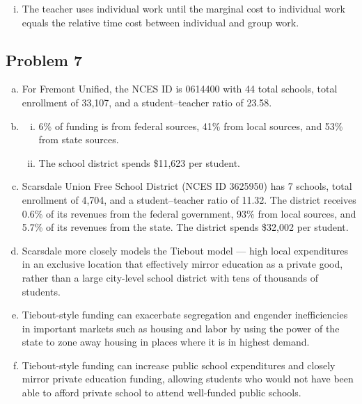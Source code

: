 \documentclass[8pt]{extarticle}
\begin{document}
\begin{enumerate}[(a)]
\begin{enumerate}[(i)]
\begin{center}
          \end{center}
        \item The teacher uses individual work until the marginal cost to individual work equals the relative time cost between individual and group work.
      \end{enumerate}
  \end{enumerate}
\subsection{Problem 7}%
\begin{enumerate}[(a)]
  \item For Fremont Unified, the NCES ID is 0614400 with 44 total schools, total enrollment of 33,107, and a student--teacher ratio of 23.58.
  \item 
    \begin{enumerate}[(i)]
      \item 6\% of funding is from federal sources, 41\% from local sources, and 53\% from state sources.
      \item The school district spends \$11,623 per student.
    \end{enumerate}
  \item Scarsdale Union Free School District (NCES ID 3625950) has 7 schools, total enrollment of 4,704, and a student--teacher ratio of 11.32. The district receives 0.6\% of its revenues from the federal government, 93\% from local sources, and 5.7\% of its revenues from the state. The district spends \$32,002 per student.
  \item Scarsdale more closely models the Tiebout model --- high local expenditures in an exclusive location that effectively mirror education as a private good, rather than a large city-level school district with tens of thousands of students.
  \item Tiebout-style funding can exacerbate segregation and engender inefficiencies in important markets such as housing and labor by using the power of the state to zone away housing in places where it is in highest demand.
  \item Tiebout-style funding can increase public school expenditures and closely mirror private education funding, allowing students who would not have been able to afford private school to attend well-funded public schools.
\end{enumerate}
\end{document}
